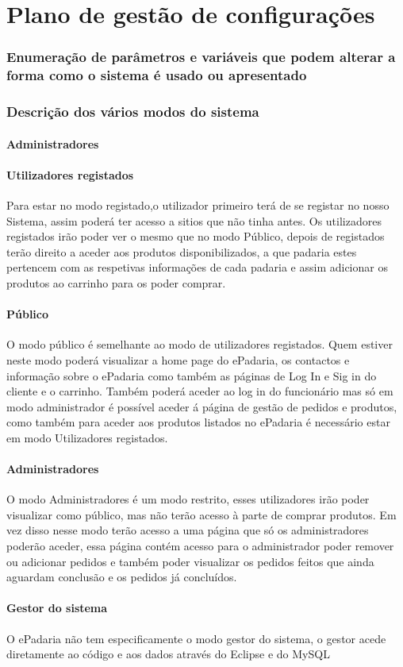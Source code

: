 \chapter{Plano de gestão de configurações}
\label{plano_de_gestao_de_configuracoes}

\subsection{Enumeração de parâmetros e variáveis que podem alterar a forma como o sistema é usado ou apresentado}

\subsection{Descrição dos vários modos do sistema}
\subsubsection{Administradores}
\subsubsection{Utilizadores registados}
Para estar no modo registado,o utilizador primeiro terá de se registar no nosso Sistema, assim poderá ter acesso a sitios que não tinha antes. Os utilizadores registados irão poder ver o mesmo que no modo Público, depois de registados terão direito a aceder aos produtos disponibilizados, a que padaria estes pertencem com as respetivas informações de cada padaria e assim adicionar os produtos ao carrinho para os poder comprar.
\subsubsection{Público}
O modo público é semelhante ao modo de utilizadores registados. Quem estiver neste modo poderá visualizar a home page do ePadaria, os contactos e informação sobre o ePadaria como também as páginas de Log In e Sig in do cliente e o carrinho. Também poderá aceder ao log in do funcionário mas só em modo administrador é possível aceder á página de gestão de pedidos e produtos, como também para aceder aos produtos listados no ePadaria é necessário estar em modo Utilizadores registados.
\subsubsection{Administradores}
O modo Administradores é um modo restrito, esses utilizadores irão poder visualizar como público, mas não terão acesso à parte de comprar produtos. Em vez disso nesse modo terão acesso a uma página que só os administradores poderão aceder, essa página contém acesso para o administrador poder remover ou adicionar pedidos e também poder visualizar os pedidos feitos que ainda aguardam conclusão e os pedidos já concluídos.
\subsubsection{Gestor do sistema}
O ePadaria não tem especificamente o modo gestor do sistema, o gestor acede diretamente ao código e aos dados através do Eclipse e do MySQL